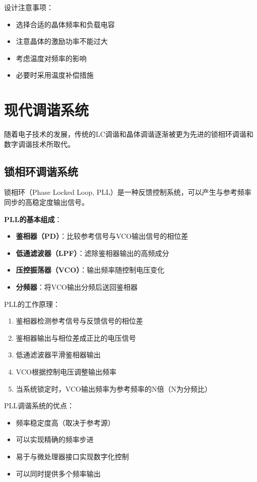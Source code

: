 设计注意事项：
\begin{itemize}
    \item 选择合适的晶体频率和负载电容
    \item 注意晶体的激励功率不能过大
    \item 考虑温度对频率的影响
    \item 必要时采用温度补偿措施
\end{itemize}

\section{现代调谐系统}
\label{sec:modern_tuning_systems}

随着电子技术的发展，传统的LC调谐和晶体调谐逐渐被更为先进的锁相环调谐和数字调谐技术所取代。

\subsection{锁相环调谐系统}
\label{sec:pll_tuning_system}

锁相环（Phase Locked Loop, PLL）是一种反馈控制系统，可以产生与参考频率同步的高稳定度输出信号。

\textbf{PLL的基本组成}：
\begin{itemize}
    \item \textbf{鉴相器（PD）}：比较参考信号与VCO输出信号的相位差
    \item \textbf{低通滤波器（LPF）}：滤除鉴相器输出的高频成分
    \item \textbf{压控振荡器（VCO）}：输出频率随控制电压变化
    \item \textbf{分频器}：将VCO输出分频后送回鉴相器
\end{itemize}

PLL的工作原理：
\begin{enumerate}
    \item 鉴相器检测参考信号与反馈信号的相位差
    \item 鉴相器输出与相位差成正比的电压信号
    \item 低通滤波器平滑鉴相器输出
    \item VCO根据控制电压调整输出频率
    \item 当系统锁定时，VCO输出频率为参考频率的N倍（N为分频比）
\end{enumerate}

PLL调谐系统的优点：
\begin{itemize}
    \item 频率稳定度高（取决于参考源）
    \item 可以实现精确的频率步进
    \item 易于与微处理器接口实现数字化控制
    \item 可以同时提供多个频率输出
\end{itemize}

